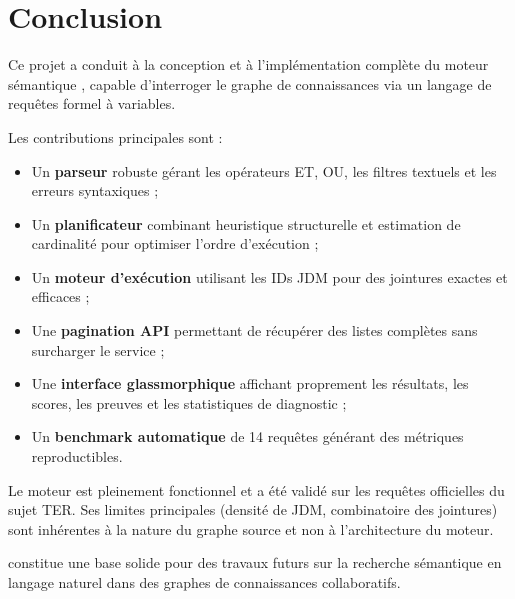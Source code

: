 \chapter{Conclusion}
\label{chap:conclu}

Ce projet a conduit à la conception et à l'implémentation complète du moteur sémantique \wido{}, capable d'interroger le graphe de connaissances \jdm{} via un langage de requêtes formel à variables.

Les contributions principales sont :
\begin{itemize}
    \item Un \textbf{parseur} robuste gérant les opérateurs ET, OU, les filtres textuels et les erreurs syntaxiques ;
    \item Un \textbf{planificateur} combinant heuristique structurelle et estimation de cardinalité pour optimiser l'ordre d'exécution ;
    \item Un \textbf{moteur d'exécution} utilisant les IDs JDM pour des jointures exactes et efficaces ;
    \item Une \textbf{pagination API} permettant de récupérer des listes complètes sans surcharger le service ;
    \item Une \textbf{interface glassmorphique} affichant proprement les résultats, les scores, les preuves et les statistiques de diagnostic ;
    \item Un \textbf{benchmark automatique} de 14 requêtes générant des métriques reproductibles.
\end{itemize}

Le moteur est pleinement fonctionnel et a été validé sur les requêtes officielles du sujet TER. Ses limites principales (densité de JDM, combinatoire des jointures) sont inhérentes à la nature du graphe source et non à l'architecture du moteur.

\wido{} constitue une base solide pour des travaux futurs sur la recherche sémantique en langage naturel dans des graphes de connaissances collaboratifs.
